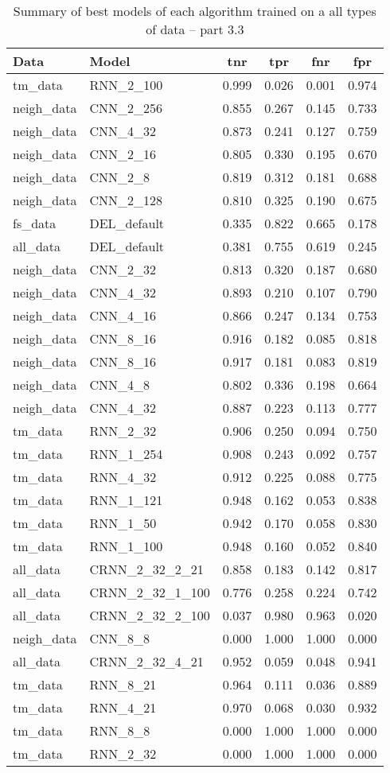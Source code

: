 \documentclass[thesis=M,english]{FITthesis}[2012/10/20]
\begin{document}
\begin{table}[H]\centering
\begin{small}
    \caption{Summary of best models of each algorithm trained on a all types of data -- part 3.3}\label{tab:all_data_summary_3_3}
    \begin{tabular}{|l|l|c|c|c|c|}\hline
Data & Model & \gls{tnr} & \gls{tpr} & \gls{fnr} & \gls{fpr} \tabularnewline \hline \hline
tm\_data & RNN\_2\_100 & 0.999 & 0.026 & 0.001 & 0.974 \tabularnewline  \hline 
neigh\_data & CNN\_2\_256 & 0.855 & 0.267 & 0.145 & 0.733 \tabularnewline  \hline 
neigh\_data & CNN\_4\_32 & 0.873 & 0.241 & 0.127 & 0.759 \tabularnewline  \hline 
neigh\_data & CNN\_2\_16 & 0.805 & 0.330 & 0.195 & 0.670 \tabularnewline  \hline 
neigh\_data & CNN\_2\_8 & 0.819 & 0.312 & 0.181 & 0.688 \tabularnewline  \hline 
neigh\_data & CNN\_2\_128 & 0.810 & 0.325 & 0.190 & 0.675 \tabularnewline  \hline 
fs\_data & DEL\_default & 0.335 & 0.822 & 0.665 & 0.178 \tabularnewline  \hline 
all\_data & DEL\_default & 0.381 & 0.755 & 0.619 & 0.245 \tabularnewline  \hline 
neigh\_data & CNN\_2\_32 & 0.813 & 0.320 & 0.187 & 0.680 \tabularnewline  \hline 
neigh\_data & CNN\_4\_32 & 0.893 & 0.210 & 0.107 & 0.790 \tabularnewline  \hline 
neigh\_data & CNN\_4\_16 & 0.866 & 0.247 & 0.134 & 0.753 \tabularnewline  \hline 
neigh\_data & CNN\_8\_16 & 0.916 & 0.182 & 0.085 & 0.818 \tabularnewline  \hline 
neigh\_data & CNN\_8\_16 & 0.917 & 0.181 & 0.083 & 0.819 \tabularnewline  \hline 
neigh\_data & CNN\_4\_8 & 0.802 & 0.336 & 0.198 & 0.664 \tabularnewline  \hline 
neigh\_data & CNN\_4\_32 & 0.887 & 0.223 & 0.113 & 0.777 \tabularnewline  \hline 
tm\_data & RNN\_2\_32 & 0.906 & 0.250 & 0.094 & 0.750 \tabularnewline  \hline 
tm\_data & RNN\_1\_254 & 0.908 & 0.243 & 0.092 & 0.757 \tabularnewline  \hline 
tm\_data & RNN\_4\_32 & 0.912 & 0.225 & 0.088 & 0.775 \tabularnewline  \hline 
tm\_data & RNN\_1\_121 & 0.948 & 0.162 & 0.053 & 0.838 \tabularnewline  \hline 
tm\_data & RNN\_1\_50 & 0.942 & 0.170 & 0.058 & 0.830 \tabularnewline  \hline 
tm\_data & RNN\_1\_100 & 0.948 & 0.160 & 0.052 & 0.840 \tabularnewline  \hline 
all\_data & CRNN\_2\_32\_2\_21 & 0.858 & 0.183 & 0.142 & 0.817 \tabularnewline  \hline 
all\_data & CRNN\_2\_32\_1\_100 & 0.776 & 0.258 & 0.224 & 0.742 \tabularnewline  \hline 
all\_data & CRNN\_2\_32\_2\_100 & 0.037 & 0.980 & 0.963 & 0.020 \tabularnewline  \hline 
neigh\_data & CNN\_8\_8 & 0.000 & 1.000 & 1.000 & 0.000 \tabularnewline  \hline 
all\_data & CRNN\_2\_32\_4\_21 & 0.952 & 0.059 & 0.048 & 0.941 \tabularnewline  \hline 
tm\_data & RNN\_8\_21 & 0.964 & 0.111 & 0.036 & 0.889 \tabularnewline  \hline 
tm\_data & RNN\_4\_21 & 0.970 & 0.068 & 0.030 & 0.932 \tabularnewline  \hline 
tm\_data & RNN\_8\_8 & 0.000 & 1.000 & 1.000 & 0.000 \tabularnewline  \hline 
tm\_data & RNN\_2\_32 & 0.000 & 1.000 & 1.000 & 0.000 \tabularnewline  \hline 
    \end{tabular}
\end{small}
\end{table}
\end{document}

